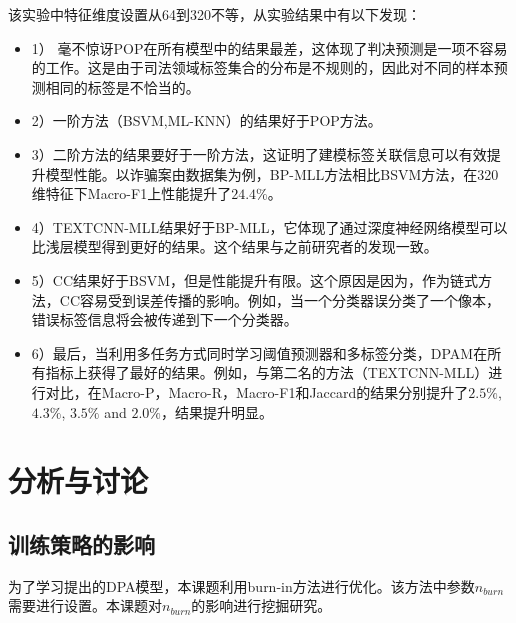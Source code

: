 该实验中特征维度设置从64到320不等，从实验结果中有以下发现：
\begin{itemize}
    \item 1） 毫不惊讶POP在所有模型中的结果最差，这体现了判决预测是一项不容易的工作。这是由于司法领域标签集合的分布是不规则的，因此对不同的样本预测相同的标签是不恰当的。
    \item 2）一阶方法（BSVM,ML-KNN）的结果好于POP方法。
    \item 3）二阶方法的结果要好于一阶方法，这证明了建模标签关联信息可以有效提升模型性能。以诈骗案由数据集为例，BP-MLL方法相比BSVM方法，在320维特征下Macro-F1上性能提升了$24.4\%$。
    \item 4）TEXTCNN-MLL结果好于BP-MLL，它体现了通过深度神经网络模型可以比浅层模型得到更好的结果。这个结果与之前研究者的发现一致\cite{Kim14}。
    \item 5）CC结果好于BSVM，但是性能提升有限。这个原因是因为，作为链式方法，CC容易受到误差传播的影响\cite{KubatSD10}。例如，当一个分类器误分类了一个像本，错误标签信息将会被传递到下一个分类器。
    \item 6）最后，当利用多任务方式同时学习阈值预测器和多标签分类，DPAM在所有指标上获得了最好的结果。例如，与第二名的方法（TEXTCNN-MLL）进行对比，在Macro-P，Macro-R，Macro-F1和Jaccard的结果分别提升了$2.5\%$, $4.3\%$, $3.5\%$ and $2.0\%$，结果提升明显。
\end{itemize}

\section{分析与讨论}
\label{sec:dpam_analysis}
\subsection{训练策略的影响}
为了学习提出的DPA模型，本课题利用burn-in方法进行优化。该方法中参数$n_{burn}$需要进行设置。本课题对$n_{burn}$的影响进行挖掘研究。

